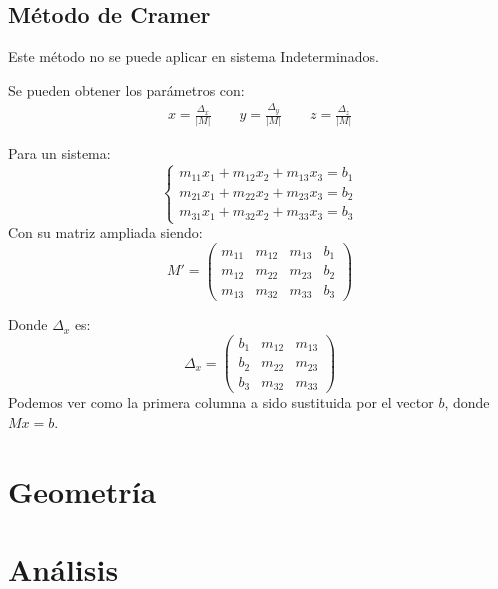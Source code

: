 \documentclass[arial,a4paper,print]{article}
\begin{document}
\subsection{Método de Cramer}
Este método no se puede aplicar en sistema Indeterminados. 

Se pueden obtener los parámetros con:
\begin{align*}
	x = \frac{\Delta_{x}}{|M|} \qquad y = \frac{\Delta_{y}}{|M|} \qquad z = \frac{\Delta_{z}}{|M|} 
\end{align*}
 
Para un sistema:
\begin{equation*}
	\begin{cases}
		m_{11}x_{1} + m_{12}x_{2} + m_{13}x_{3} = b_{1} \\
		m_{21}x_{1} + m_{22}x_{2} + m_{23}x_{3} = b_{2} \\
		m_{31}x_{1} + m_{32}x_{2} + m_{33}x_{3} = b_{3} 
	\end{cases}
\end{equation*}
Con su matriz ampliada siendo:
\begin{equation*}
	M' = \left(\begin{array}{lll|l}
			m_{11} & m_{12} & m_{13} & b_{1}\\
			m_{12} & m_{22} & m_{23} & b_{2}\\
			m_{13} & m_{32} & m_{33} & b_{3}
	\end{array}\right)
\end{equation*}

Donde $\Delta_{x}$ es:
\begin{equation*}
	\Delta_{x} = \begin{pmatrix}
		b_{1} & m_{12} & m_{13} \\
		b_{2} & m_{22} & m_{23} \\
		b_{3} & m_{32} & m_{33} 
	\end{pmatrix}
\end{equation*}
Podemos ver como la primera columna a sido sustituida por el vector $b$, donde $Mx=b$.

\pagebreak

\section{Geometría}



\section{Análisis}
\end{document}
